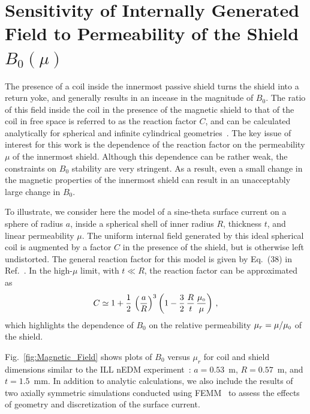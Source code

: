 

\section{Sensitivity of Internally Generated Field to Permeability of the Shield $B_0(\mu)$\label{sec:calculation}}

The presence of a coil inside the innermost passive shield turns the
shield into a return yoke, and generally results in an incease in the
magnitude of $B_0$.  The ratio of this field inside the coil in the
presence of the magnetic shield to that of the coil in free space is
referred to as the reaction factor $C$, and can be calculated
analytically for spherical and infinite cylindrical
geometries~\cite{bib:bidinostimartin,bib:urankar}.  The key issue of
interest for this work is the dependence of the reaction factor on the
permeability $\mu$ of the innermost shield.  Although this dependence
can be rather weak, the constraints on $B_0$ stability are very
stringent.  As a result, even a small change in the magnetic
properties of the innermost shield can result in an unacceptably large
change in $B_0$.


To illustrate, we consider here the model of a sine-theta surface
current on a sphere of radius $a$, inside a spherical shell of inner
radius $R$, thickness $t$, and linear permeability $\mu$.  The uniform
internal field generated by this ideal spherical coil is augmented by
a factor $C$ in the presence of the shield, but is otherwise left
undistorted.  The general reaction factor for this model is given by
Eq.~(38) in Ref.~\cite{bib:bidinostimartin}.  In the high-$\mu$ limit,
with $t\ll R$, the reaction factor can be approximated as
\begin{equation}
C 
 \simeq 1+ \frac{1}{2}\, \left( \frac{a}{R} \right)^{3} \left( 1- \frac{3}{2} \, \frac{R}{t} \, \frac{\mu_{\scriptscriptstyle 0}}{\mu} \right) \, ,
 \label{Csphere}
\end{equation}
which highlights the dependence of $B_0$ on the relative permeability
$\mu_r=\mu/\mu_{\scriptscriptstyle 0}$ of the shield.

Fig.~\ref{fig:Magnetic_Field} shows plots of $B_0$ versus $\mu_r$ for
coil and shield dimensions similar to the ILL nEDM
experiment~\cite{bib:baker,bib:knecht}: $a=0.53$~m, $R= 0.57$~m, and
$t=1.5$~mm.  In addition to analytic calculations, we also include the
results of two axially symmetric simulations conducted using
FEMM~\cite{bib:femm} to assess the effects of geometry and
discretization of the surface current.

